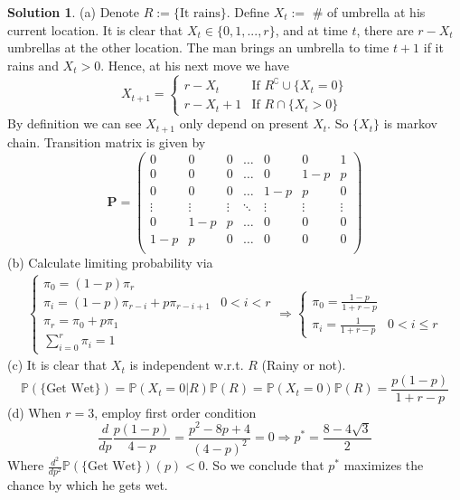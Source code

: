 \documentclass[a4paper, 10pt]{article}
\theoremstyle{definition}
\theoremstyle{hSol}
\newtheorem*{solution}{Solution}
\begin{document}
\begin{solution} (a) Denote $R:=\{\text{It rains}\}$. Define $X_t:=$ \# of umbrella at his current location. It is clear that $X_t \in \{0,1,...,r\}$, and at time $t$, there are $r-X_t$ umbrellas at the other location. The man brings an umbrella to time $t+1$ if it rains and $X_t>0$. Hence, at his next move we have
\begin{equation}
  X_{t+1} = \begin{cases}
  r-X_t & \text{If $R^{\complement} \cup \{X_t=0\}$} \\
  r-X_t+1 & \text{If $R \cap \{X_t> 0\}$}
  \end{cases}
\end{equation}
By definition we can see $X_{t+1}$ only depend on present $X_t$. So $\{X_t\}$ is markov chain. Transition matrix is given by
\begin{equation}
  \bm{P} = \begin{pmatrix}
    0 & 0 & 0 & \dots & 0 & 0 & 1\\
    0 & 0 & 0 & \dots & 0 & 1-p & p\\
    0 & 0 & 0 & \dots & 1-p & p & 0\\
    \vdots & \vdots & \vdots & \ddots & \vdots & \vdots & \vdots\\
    0 & 1-p & p & \dots & 0 & 0 & 0\\
    1-p & p & 0 & \dots & 0 & 0 & 0\\
  \end{pmatrix}
\end{equation}
(b) Calculate limiting probability via
\begin{equation}
  \begin{split}
    \begin{cases}
    \pi_0 = (1-p)\pi_r & \\
    \pi_i = (1-p)\pi_{r-i} + p\pi_{r-i+1} & 0<i<r\\
    \pi_r = \pi_0 + p\pi_1 \\
    \sum_{i=0}^r \pi_i = 1
    \end{cases} 
    \Rightarrow
    \begin{cases}
    \pi_0 = \frac{1-p}{1+r-p} & \\
    \pi_i = \frac{1}{1+r-p} & 0<i\leq r
    \end{cases} 
  \end{split}
\end{equation}
(c) It is clear that $X_t$ is independent w.r.t. $R$ (Rainy or not). 
\begin{equation}
  \mathbb{P}\left(\{\text{Get Wet}\}\right) = \mathbb{P}\left(X_t=0|R\right)\mathbb{P}\left(R\right) = \mathbb{P}\left(X_t=0\right)\mathbb{P}\left(R\right) = \frac{p(1-p)}{1+r-p}
\end{equation}
(d) When $r=3$, employ first order condition
\begin{equation}
  \frac{d}{dp} \frac{p(1-p)}{4-p} = \frac{p^2-8p+4}{(4-p)^2} =0 \Rightarrow p^*=\frac{8-4\sqrt{3}}{2}
\end{equation}
Where $\frac{d^2}{dp^2}\mathbb{P}\left(\{\text{Get Wet}\}\right)(p)<0$. So we conclude that $p^*$ maximizes the chance by which he gets wet.
\end{solution}
\end{document}
